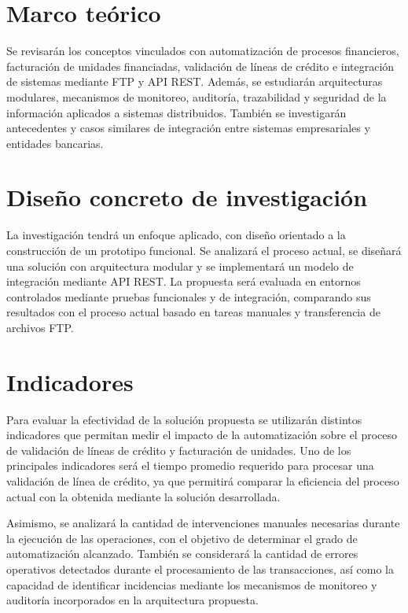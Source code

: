 \section{Marco teórico}

Se revisarán los conceptos vinculados con automatización de procesos financieros, facturación de unidades financiadas, validación de líneas de crédito e integración de sistemas mediante FTP y API REST. Además, se estudiarán arquitecturas modulares, mecanismos de monitoreo, auditoría, trazabilidad y seguridad de la información aplicados a sistemas distribuidos. También se investigarán antecedentes y casos similares de integración entre sistemas empresariales y entidades bancarias.

\section{Diseño concreto de investigación}

La investigación tendrá un enfoque aplicado, con diseño orientado a la construcción de un prototipo funcional. Se analizará el proceso actual, se diseñará una solución con arquitectura modular y se implementará un modelo de integración mediante API REST. La propuesta será evaluada en entornos controlados mediante pruebas funcionales y de integración, comparando sus resultados con el proceso actual basado en tareas manuales y transferencia de archivos FTP.

\section{Indicadores}

Para evaluar la efectividad de la solución propuesta se utilizarán distintos indicadores que permitan medir el impacto de la automatización sobre el proceso de validación de líneas de crédito y facturación de unidades. Uno de los principales indicadores será el tiempo promedio requerido para procesar una validación de línea de crédito, ya que permitirá comparar la eficiencia del proceso actual con la obtenida mediante la solución desarrollada.

Asimismo, se analizará la cantidad de intervenciones manuales necesarias durante la ejecución de las operaciones, con el objetivo de determinar el grado de automatización alcanzado. También se considerará la cantidad de errores operativos detectados durante el procesamiento de las transacciones, así como la capacidad de identificar incidencias mediante los mecanismos de monitoreo y auditoría incorporados en la arquitectura propuesta.

